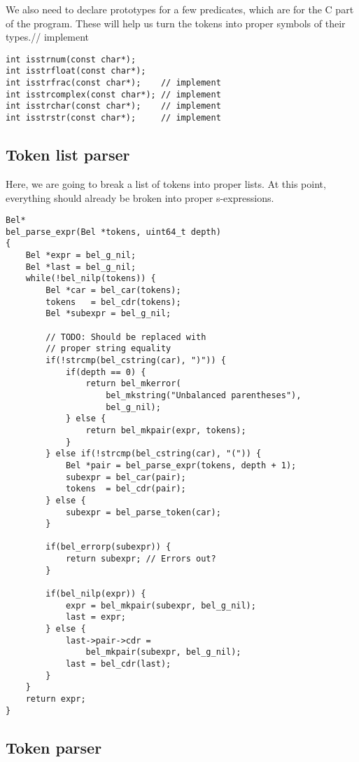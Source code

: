 \documentclass[openright,a4paper,twoside,12pt]{memoir}
\begin{document}
We also need to declare prototypes for a few predicates, which are for
the C  part of the  program. These will help  us turn the  tokens into
proper symbols of their types.// implement

\begin{verbatim}
int isstrnum(const char*);
int isstrfloat(const char*);
int isstrfrac(const char*);    // implement
int isstrcomplex(const char*); // implement
int isstrchar(const char*);    // implement
int isstrstr(const char*);     // implement
\end{verbatim}

\subsection{Token list parser}
\label{sec:org9f16e8a}

Here, we  are going to  break a list of  tokens into proper  lists. At
this  point,   everything  should   already  be  broken   into  proper
s-expressions.

\begin{verbatim}
Bel*
bel_parse_expr(Bel *tokens, uint64_t depth)
{
    Bel *expr = bel_g_nil;
    Bel *last = bel_g_nil;
    while(!bel_nilp(tokens)) {
        Bel *car = bel_car(tokens);
        tokens   = bel_cdr(tokens);
        Bel *subexpr = bel_g_nil;

        // TODO: Should be replaced with
        // proper string equality
        if(!strcmp(bel_cstring(car), ")")) {
            if(depth == 0) {
                return bel_mkerror(
                    bel_mkstring("Unbalanced parentheses"),
                    bel_g_nil);
            } else {
                return bel_mkpair(expr, tokens);
            }
        } else if(!strcmp(bel_cstring(car), "(")) {
            Bel *pair = bel_parse_expr(tokens, depth + 1);
            subexpr = bel_car(pair);
            tokens  = bel_cdr(pair);
        } else {
            subexpr = bel_parse_token(car);
        }

        if(bel_errorp(subexpr)) {
            return subexpr; // Errors out?
        }

        if(bel_nilp(expr)) {
            expr = bel_mkpair(subexpr, bel_g_nil);
            last = expr;
        } else {
            last->pair->cdr =
                bel_mkpair(subexpr, bel_g_nil);
            last = bel_cdr(last);
        }
    }
    return expr;
}
\end{verbatim}

\subsection{Token parser}
\label{sec:org7a0aa81}
\end{document}
